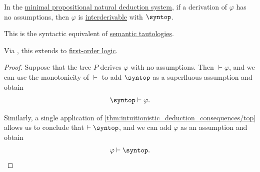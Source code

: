 \begin{proposition}\label{thm:propositional_natural_deduction_tautologies}
  In the \hyperref[def:propositional_natural_deduction]{minimal propositional natural deduction system}, if a derivation of \( \varphi \) has no assumptions, then \( \varphi \) is \hyperref[def:interderivability]{interderivable} with \( \syntop \).
\end{proposition}
\begin{comments}
  \item This is the syntactic equivalent of \hyperref[def:propositional_semantics/tautology]{semantic tautologies}.
  \item Via , this extends to \hyperref[def:first_order_logic]{first-order logic}.
\end{comments}
\begin{proof}
  Suppose that the tree \( P \) derives \( \varphi \) with no assumptions. Then \( \vdash \varphi \), and we can use the monotonicity of \( {\vdash} \) to add \( \syntop \) as a superfluous assumption and obtain
  \begin{equation*}
    \syntop \vdash \varphi.
  \end{equation*}

  Similarly, a single application of \ref{thm:intuitionistic_deduction_consequences/top} allows us to conclude that \( \vdash \syntop \), and we can add \( \varphi \) as an assumption and obtain
  \begin{equation*}
    \varphi \vdash \syntop.
  \end{equation*}
\end{proof}

